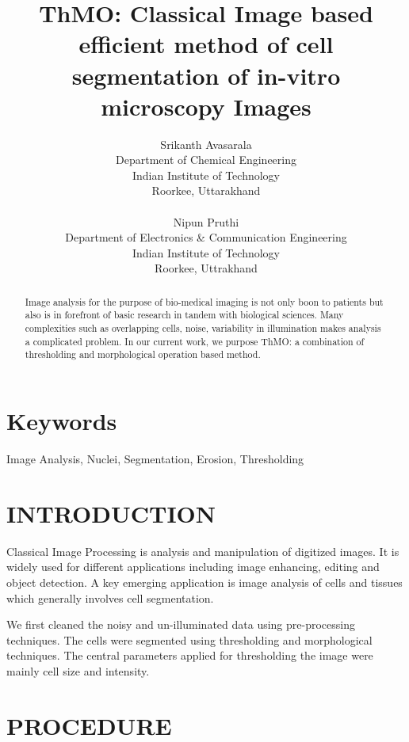 \documentclass[letterpaper, 10 pt, conference]{ieeeconf}
\title{\LARGE \bf
ThMO: Classical Image based efficient method of cell segmentation of in-vitro 
microscopy Images
}
\author{ \parbox{3 in}{\centering Srikanth Avasarala
        \\
         Department of Chemical Engineering \\
       Indian Institute of Technology\\
       Roorkee, Uttarakhand \\
        }
         \hspace*{ 0.5 in}
         \parbox{3 in}{ \centering Nipun Pruthi
         \\
        Department of Electronics \& Communication Engineering \\         Indian Institute of Technology\\
         Roorkee, Uttrakhand\\
        }
}
\begin{document}
\maketitle
\thispagestyle{empty}
\pagestyle{empty}
\begin{abstract}
Image analysis for the purpose of bio-medical imaging is not only boon to patients but also is in forefront of basic research in tandem with biological sciences. Many complexities such as overlapping cells, noise, variability in illumination makes analysis a complicated problem. In our current work, we purpose ThMO: a combination of thresholding and morphological operation based method.
\end{abstract}

\section*{Keywords}
Image Analysis, Nuclei, Segmentation, Erosion, Thresholding
\section{INTRODUCTION}

Classical Image Processing is analysis and manipulation of digitized images. It is widely used for different applications including image enhancing, editing and object detection. A key emerging application is image analysis of cells and tissues which generally involves cell segmentation. 

We first cleaned the noisy and un-illuminated data using pre-processing techniques. The cells were segmented using thresholding and morphological techniques. The central parameters applied for thresholding the image were mainly cell size and intensity.

\section{PROCEDURE}
\end{document}
